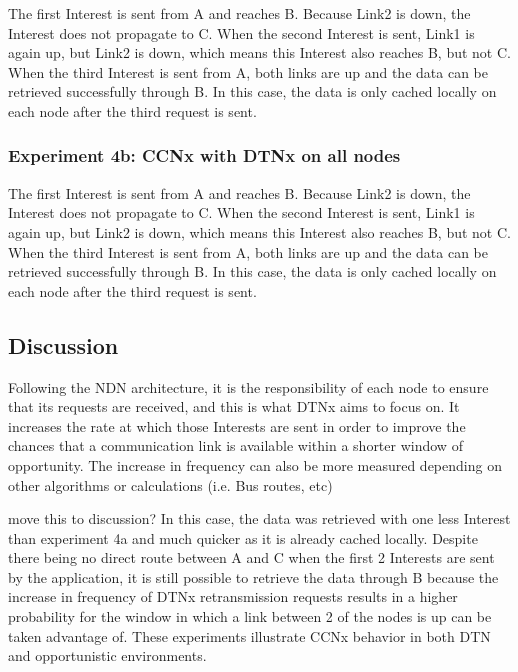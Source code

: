 \documentclass[a4paper,12pt]{report}      %
\begin{document}
The first Interest is sent from A and reaches B. Because Link2 is down, the Interest does not propagate
to C. When the second Interest is sent, Link1 is again up, but Link2 is down, which means this Interest
also reaches B, but not C. When the third Interest is sent from A, both links are up and the data can be
retrieved successfully through B. In this case, the data is only cached locally on each node after the
third request is sent.

\subsubsection{Experiment 4b: CCNx with DTNx on all nodes}


The first Interest is sent from A and reaches B. Because Link2 is down, the Interest does not propagate
to C. When the second Interest is sent, Link1 is again up, but Link2 is down, which means this Interest
also reaches B, but not C. When the third Interest is sent from A, both links are up and the data can be
retrieved successfully through B. In this case, the data is only cached locally on each node after the
third request is sent.

\subsection{Discussion}

Following the NDN architecture, it is the responsibility of each node to ensure that its requests are
received, and this is what DTNx aims to focus on. It increases the rate at which those Interests are sent
in order to improve the chances that a communication link is available within a shorter window of
opportunity.{ The increase in frequency can also be more measured depending on other algorithms or
calculations (i.e. Bus routes, etc)}

{move this to discussion?} In this case, the data was retrieved with one less Interest than experiment 4a
and much quicker as it is already cached locally. Despite there being no direct route between A and C
when the first 2 Interests are sent by the application, it is still possible to retrieve the data through B
because the increase in frequency of DTNx retransmission requests results in a higher probability for
the window in which a link between 2 of the nodes is up can be taken advantage of.
These experiments illustrate CCNx behavior in both DTN and opportunistic environments.
\end{document}
